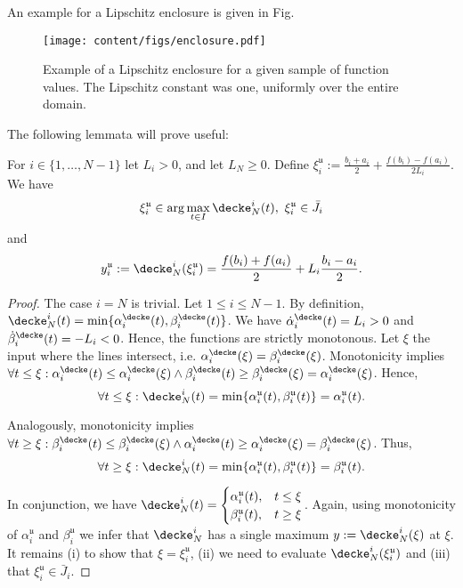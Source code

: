 An example for a Lipschitz enclosure is given in Fig. 
\begin{figure*}
	\centering
		\texttt{[image: content/figs/enclosure.pdf]}
	\caption{Example of a Lipschitz enclosure for a given sample of function values. The Lipschitz constant was one, uniformly over the entire domain.}
	\label{fig:enclosure}
\end{figure*}


The following lemmata will prove useful:

\begin{lem} \label{lem:ceiling_values}
For $i \in \{1,\ldots,N-1\}$ let  $L_i > 0$, and let $L_N \geq 0$.
Define $\xi^{\mathfrak u}_i :=  \frac{b_i+a_i}{2}+ \frac{f(b_i) - f(a_i)}{2 L_i}  $.\\
We have 
\[\xi^{\mathfrak u}_i \in \arg\max_{t \in I} \decke^i_N (t), \,\,\xi^{\mathfrak u}_i \in \bar J_i\]
and 
 \[y^{\mathfrak u}_i := \decke_N^i(\xi^{\mathfrak u}_i) = \frac{f(b_i) +f(a_i)}{2} + L_i \frac{b_i-a_i}{2} .\]
\begin{proof} The case $i = N$ is trivial. Let $1 \leq i \leq N-1$. By definition,
$\decke^i_N (t) = \min\{ \alpha^\decke_i(t), \beta^\decke_i(t)\}$.
We have $\dot  \alpha^\decke_i(t) = L_i > 0$ and $\dot  \beta^\decke_i(t) = - L_i < 0$. Hence, the functions are strictly monotonous. Let $\xi$ the input where the lines intersect, i.e. $\alpha^\decke_i(\xi) = \beta^\decke_i(\xi)$. Monotonicity implies $\forall t \leq \xi : \alpha^\decke_i(t) \leq \alpha^\decke_i(\xi) \wedge \beta^\decke_i(t) \geq \beta^\decke_i(\xi) = \alpha^\decke_i(\xi)$. 
Hence,
 \[\forall t \leq \xi: \decke_N^i(t) = \min \{\alpha_i^{\mathfrak u} (t), \beta_i^{\mathfrak u} (t) \}= \alpha_i^{\mathfrak u} (t).\] 
 
Analogously, monotonicity implies $\forall t \geq \xi : \beta^\decke_i(t) \leq \beta^\decke_i(\xi) \wedge \alpha^\decke_i(t) \geq \alpha^\decke_i(\xi) = \beta^\decke_i(\xi)$. 
Thus,
 \[\forall t \geq \xi: \decke_N^i(t) = \min \{\alpha_i^{\mathfrak u} (t), \beta_i^{\mathfrak u} (t) \}= \beta_i^{\mathfrak u} (t).\] 

In conjunction, we have 
 $\decke_N^i(t) = 
 \begin{cases}  
 \alpha_i^{\mathfrak u} (t), & t \leq \xi \\
 \beta_i^{\mathfrak u} (t), & t \geq \xi 
 \end{cases}$.
 Again, using monotonicity of $\alpha_i^{\mathfrak u}$ and $\beta_i^{\mathfrak u}$ we infer that $\decke_N^i$ has a single maximum $y := \decke_N^i(\xi)$ at $\xi$.
It remains  (i) to show that $\xi = \xi_i^{\mathfrak u}$, (ii) we need to evaluate $\decke_N^i(\xi^{\mathfrak u}_i)$ and (iii) that $\xi^{\mathfrak u}_i \in \bar J_i$.


\end{proof}
\end{lem}

